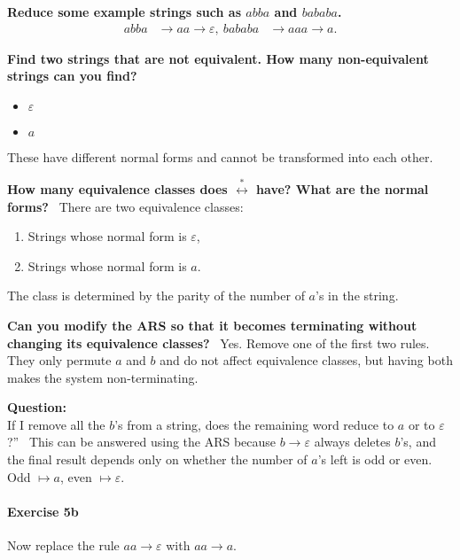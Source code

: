 \documentclass{article}
\theoremstyle{theorem}
\theoremstyle{definition}
\theoremstyle{remark}
\begin{document}
\begin{enumerate}
   \textbf{Reduce some example strings such as $abba$ and $bababa$.}
  \begin{align}
    abba &\to aa \to \varepsilon, \
    bababa &\to aaa \to a.
  \end{align}

   \textbf{Find two strings that are not equivalent. How many non-equivalent strings can you find?}
  \begin{itemize}
    \item $\varepsilon$
    \item $a$
  \end{itemize}
  These have different normal forms and cannot be transformed into each other.

   \textbf{How many equivalence classes does $\stackrel{\ast}{\longleftrightarrow}$ have? What are the normal forms?} \
  There are two equivalence classes:
  \begin{enumerate}
    \item Strings whose normal form is $\varepsilon$,
    \item Strings whose normal form is $a$.
  \end{enumerate}
  The class is determined by the parity of the number of $a$’s in the string.

   \textbf{Can you modify the ARS so that it becomes terminating without changing its equivalence classes?} \
  Yes. Remove one of the first two rules. They only permute $a$ and $b$ and do not affect equivalence classes, but having both makes the system non-terminating.

   \textbf{Question:} \\
If I remove all the $b$’s from a string, does the remaining word reduce to $a$ or to $\varepsilon$?”  
\ans\ This can be answered using the ARS because $b \to \varepsilon$ always deletes $b$’s, and the final result depends only on whether the number of $a$’s left is odd or even. Odd $\mapsto a$, even $\mapsto \varepsilon$.

\end{enumerate}
\paragraph{Exercise 5b}

Now replace the rule $aa \to \varepsilon$ with $aa \to a$.
\end{document}
